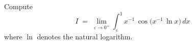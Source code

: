 \documentclass{article}
\begin{document}
Compute
\[
  I \;=\; \lim_{\varepsilon \to 0^+}
        \int_{\varepsilon}^{1}
        x^{-1}\,\cos\!\bigl(x^{-1}\,\ln x\bigr)\,dx
\]
where $\ln$ denotes the natural logarithm.
\end{document}
